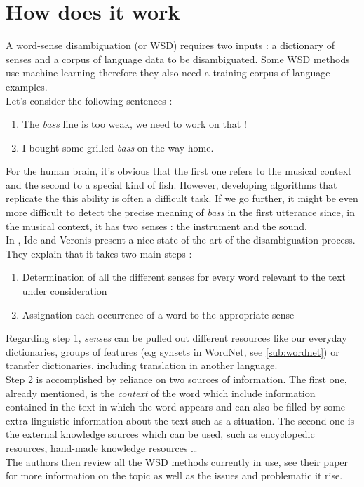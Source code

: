 \section{How does it work} %
\label{sec:how_does_it_work}
A word-sense disambiguation (or WSD) requires two inputs : a dictionary of senses and a corpus of language data to be disambiguated. Some WSD methods use machine learning therefore they also need a training corpus of language examples.\\
Let's consider the following sentences :
\begin{enumerate}
	\item The \textit{bass} line is too weak, we need to work on that !
	\item I bought some grilled \textit{bass} on the way home.
\end{enumerate}
For the human brain, it's obvious that the first one refers to the musical context and the second to a special kind of fish. However, developing algorithms that replicate the this ability is often a difficult task. If we go further, it might be even more difficult to detect the precise meaning of \textit{bass} in the first utterance since, in the musical context, it has two senses : the instrument and the sound.\\
In \cite{ide1998introduction}, Ide and Veronis present a nice state of the art of the disambiguation process. They explain that it takes two main steps :
\begin{enumerate}
 	\item Determination of all the different senses for every word relevant to the text under consideration
 	\item Assignation each occurrence of a word to the appropriate sense
\end{enumerate} 
Regarding step 1, \textit{senses} can be pulled out different resources like our everyday dictionaries, groups of features (e.g synsets in WordNet, see \ref{sub:wordnet}) or transfer dictionaries, including translation in another language.\\
Step 2 is accomplished by reliance on two sources of information. The first one, already mentioned, is the \textit{context} of the word which include information contained in the text in which the word appears and can also be filled by some extra-linguistic information about the text such as a situation. The second one is the external knowledge sources which can be used, such as encyclopedic resources, hand-made knowledge resources \dots\\
The authors then review all the WSD methods currently in use, see their paper for more information on the topic as well as the issues and problematic it rise.\\

